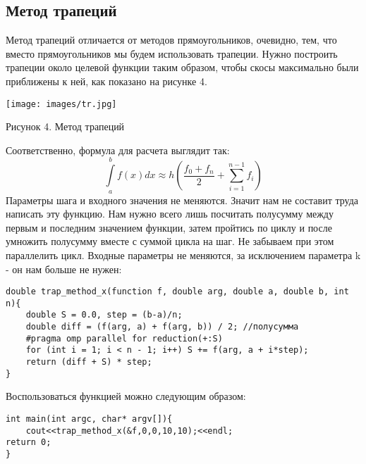 \documentclass{article}
\begin{document}
\subsection{Метод трапеций}
Метод трапеций отличается от методов прямоугольников, очевидно, тем, что вместо прямоугольников мы будем использовать трапеции. Нужно построить трапеции около целевой функции таким образом, чтобы скосы максимально были приближены к ней, как показано на рисунке 4.
\begin{center}
\texttt{[image: images/tr.jpg]}

Рисунок 4. Метод трапеций
\end{center}
Соответственно, формула для расчета выглядит так:
$$\int\limits_a^b f(x)dx \approx h(\frac{f_0+f_n}{2}+\sum_{i=1}^{n-1} f_i)$$
Параметры шага и входного значения не меняются. Значит нам не составит труда написать эту функцию. Нам нужно всего лишь посчитать полусумму между первым и последним значением функции, затем пройтись по циклу и после умножить полусумму вместе с суммой цикла на шаг. Не забываем при этом параллелить цикл. Входные параметры не меняются, за исключением параметра k - он нам больше не нужен:
\begin{lstlisting}
double trap_method_x(function f, double arg, double a, double b, int n){
    double S = 0.0, step = (b-a)/n;
    double diff = (f(arg, a) + f(arg, b)) / 2; //полусумма
    #pragma omp parallel for reduction(+:S)
    for (int i = 1; i < n - 1; i++) S += f(arg, a + i*step);
    return (diff + S) * step;
}
\end{lstlisting}
Воспользоваться функцией можно следующим образом:
\begin{lstlisting}
int main(int argc, char* argv[]){
    cout<<trap_method_x(&f,0,0,10,10);<<endl;
return 0;
}
\end{lstlisting}
\end{document}
